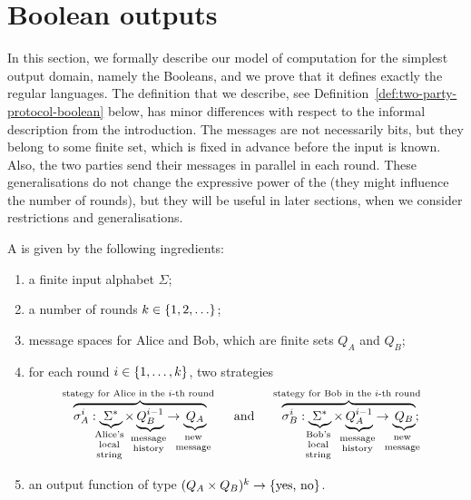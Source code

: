 
\section{Boolean outputs}
\label{sec:boolean-domain}

In this section, we formally describe our model of computation for the simplest
output domain, namely the Booleans, and we prove that it defines exactly the
regular languages.  The definition that we describe, see
Definition~\ref{def:two-party-protocol-boolean} below, has minor differences
with respect to the informal description from the introduction. The messages
are not necessarily bits, but they belong to some finite set, which is fixed in
advance before the input is known. Also,  the two parties send their messages
in parallel in each round. These generalisations do not change the expressive
power of the  (they might influence the number of rounds), but they
will be useful in later sections, when we consider restrictions and
generalisations. 

\begin{definition}
    \label{def:two-party-protocol-boolean}
   A 
   is given by the following ingredients: 
  \begin{enumerate}
    \item a finite input alphabet $\Sigma$;
    \item a number of rounds $k \in \{1,2,\ldots\}$;
    \item message spaces for Alice and Bob, which are finite sets $Q_A$ and $Q_B$;
    \item for each round $i \in \{1,\ldots,k\}$, two strategies
    \begin{align*}
    \myoverbrace{\sigma_A^i : \myunderbrace{\Sigma^*}{Alice's \\ local\\ string} \times \myunderbrace{Q_B^{i-1}}{message \\ history}  \to \myunderbrace{Q_A}{new\\ message}}{stategy for Alice in the $i$-th round}
    \qquad \text{and} \qquad 
        \myoverbrace{\sigma_B^i : \myunderbrace{\Sigma^*}{Bob's \\ local\\ string} \times \myunderbrace{Q_A^{i-1}}{message \\ history}  \to \myunderbrace{Q_B}{new\\ message}}{stategy for Bob in the $i$-th round};
    \end{align*}
    \item an output function of type $(Q_A \times Q_B)^{k} \to \{\text{yes, no}\}$.
  \end{enumerate}
\end{definition}

